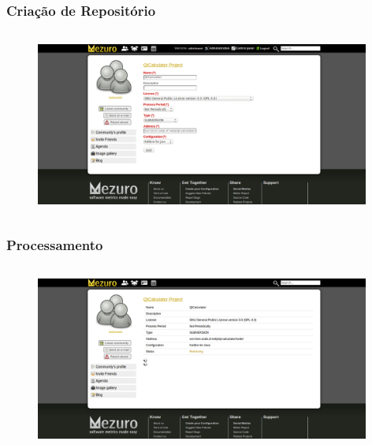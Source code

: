 \documentclass{beamer}
\begin{document}
    \begin{frame}
      \frametitle{Criação de Repositório}
      \framesubtitle{}
    
      \begin{figure}
        \begin{center}
          \includegraphics[width=11cm, height=6cm]{images/07-repository-creation.png}
          \label{fig:repository-creation}
        \end{center}
      \end{figure}
    \end{frame}
    
    \begin{frame}
      \frametitle{Processamento}
      \framesubtitle{}
    
      \begin{figure}
        \begin{center}
          \includegraphics[width=11cm, height=6cm]{images/08-processing.png}
          \label{fig:processing}
        \end{center}
      \end{figure}
    \end{frame}
    
\end{document}
